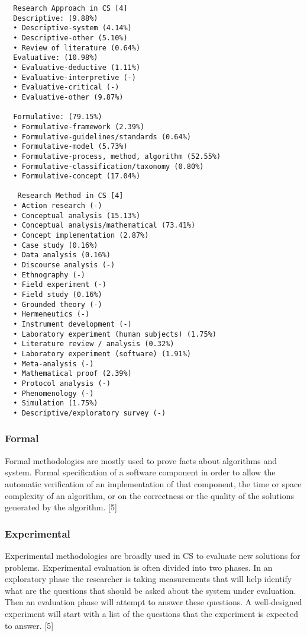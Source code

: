\begin{verbatim}
  Research Approach in CS [4]
  Descriptive: (9.88%)
  •	Descriptive-system (4.14%)
  •	Descriptive-other (5.10%)
  •	Review of literature (0.64%)
  Evaluative: (10.98%)
  •	Evaluative-deductive (1.11%)
  •	Evaluative-interpretive (-)
  •	Evaluative-critical (-)
  •	Evaluative-other (9.87%)

  Formulative: (79.15%)
  •	Formulative-framework (2.39%)
  •	Formulative-guidelines/standards (0.64%)
  •	Formulative-model (5.73%)
  •	Formulative-process, method, algorithm (52.55%)
  •	Formulative-classification/taxonomy (0.80%)
  •	Formulative-concept (17.04%)

   Research Method in CS [4]
  •	Action research (-)
  •	Conceptual analysis (15.13%)
  •	Conceptual analysis/mathematical (73.41%)
  •	Concept implementation (2.87%)
  •	Case study (0.16%)
  •	Data analysis (0.16%)
  •	Discourse analysis (-)
  •	Ethnography (-)
  •	Field experiment (-)
  •	Field study (0.16%)
  •	Grounded theory (-)
  •	Hermeneutics (-)
  •	Instrument development (-)
  •	Laboratory experiment (human subjects) (1.75%)
  •	Literature review / analysis (0.32%)
  •	Laboratory experiment (software) (1.91%)
  •	Meta-analysis (-)
  •	Mathematical proof (2.39%)
  •	Protocol analysis (-)
  •	Phenomenology (-)
  •	Simulation (1.75%)
  •	Descriptive/exploratory survey (-)
\end{verbatim}

\subsubsection{Formal}

Formal methodologies are mostly used to prove facts about algorithms and system. Formal specification of a software component in order to allow the automatic verification of an implementation of that component, the time or space complexity of an algorithm, or on the correctness or the quality of the solutions generated by the algorithm. [5]

\subsubsection{Experimental}

Experimental methodologies are broadly used in CS to evaluate new solutions for problems. Experimental evaluation is often divided into two phases. In an exploratory phase the researcher is taking measurements that will help identify what are the questions that should be asked about the system under evaluation. Then an evaluation phase will attempt to answer these questions. A well-designed experiment will start with a list of the questions that the experiment is expected to answer. [5]

